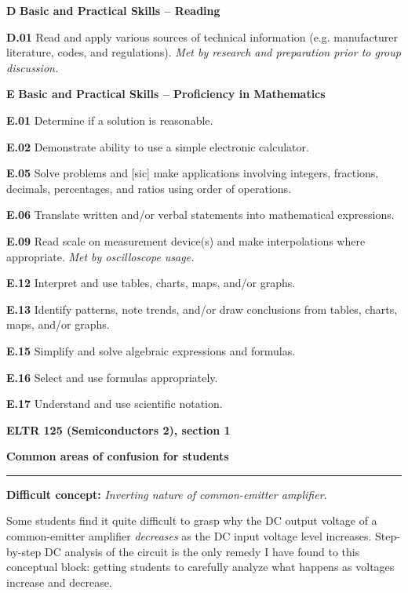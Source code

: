 \item{\bf D} {\bf Basic and Practical Skills -- Reading}
\item{\bf D.01} Read and apply various sources of technical information (e.g. manufacturer literature, codes, and regulations).  {\it Met by research and preparation prior to group discussion.}
\item{\bf E} {\bf Basic and Practical Skills -- Proficiency in Mathematics}
\item{\bf E.01} Determine if a solution is reasonable.
\item{\bf E.02} Demonstrate ability to use a simple electronic calculator.
\item{\bf E.05} Solve problems and [sic] make applications involving integers, fractions, decimals, percentages, and ratios using order of operations.
\item{\bf E.06} Translate written and/or verbal statements into mathematical expressions.
\item{\bf E.09} Read scale on measurement device(s) and make interpolations where appropriate.  {\it Met by oscilloscope usage.}
\item{\bf E.12} Interpret and use tables, charts, maps, and/or graphs.
\item{\bf E.13} Identify patterns, note trends, and/or draw conclusions from tables, charts, maps, and/or graphs.
\item{\bf E.15} Simplify and solve algebraic expressions and formulas.
\item{\bf E.16} Select and use formulas appropriately.
\item{\bf E.17} Understand and use scientific notation.
\medskip





\vfil \eject

\centerline{\bf ELTR 125 (Semiconductors 2), section 1} \bigskip 
 
\vskip 10pt

\noindent
{\bf Common areas of confusion for students}

\vskip 5pt


\hrule \vskip 5pt

\vskip 10pt

\noindent
{\bf Difficult concept: } {\it Inverting nature of common-emitter amplifier.}

Some students find it quite difficult to grasp why the DC output voltage of a common-emitter amplifier {\it decreases} as the DC input voltage level increases.  Step-by-step DC analysis of the circuit is the only remedy I have found to this conceptual block: getting students to carefully analyze what happens as voltages increase and decrease.

